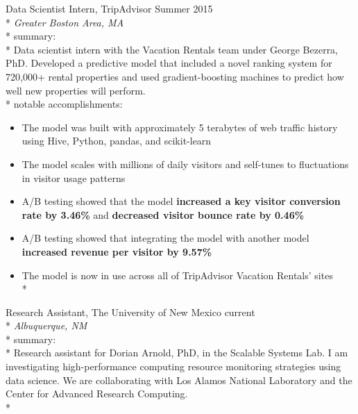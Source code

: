 \documentclass[print]{friggeri-cv} %
\begin{document}
\iftoggle{cv}{
\section{research/work experience}
}{
\section{selected research/work experience}
}
\begin{description} \itemsep1pt \parskip0pt 
  \item {\largeheaderfont Data Scientist Intern, TripAdvisor} \hfill
    {\smallheaderfont Summer 2015}\\*
    {\footnotesize \emph{Greater Boston Area, MA}} \\*
    {\smallheaderfont summary}: \\*
    Data scientist intern with the Vacation Rentals team under George Bezerra, PhD.
    Developed a predictive model that included a novel ranking system for
    720,000+ rental properties and used gradient-boosting machines to predict
    how well new properties will perform. \\*
    {\smallheaderfont notable accomplishments}:
    \begin{itemize} \itemsep1pt \parskip1pt 
      \item The model was built with approximately 5 terabytes of web traffic
            history using Hive, Python, pandas, and scikit-learn
      \item The model scales with millions of daily visitors and self-tunes to
            fluctuations in visitor usage patterns
      \item A/B testing showed that the model \textbf{increased a key visitor conversion
            rate by 3.46\%} and \textbf{decreased visitor bounce rate by 0.46\%}
      \item A/B testing showed that integrating the model with another model
            \textbf{increased revenue per visitor by 9.57\%}
      \item The model is now in use across all of TripAdvisor Vacation Rentals' sites\\*
    \end{itemize}

  \item {\largeheaderfont Research Assistant, The University of New Mexico} \hfill
    {\textemdash current}\\*
    {\footnotesize \emph{Albuquerque, NM }} \\*
    {\smallheaderfont summary}: \\*
    Research assistant for Dorian Arnold, PhD, in the Scalable Systems Lab.  I
    am investigating high-performance computing resource monitoring strategies
    using data science. We are collaborating with Los Alamos National
    Laboratory and the Center for Advanced Research Computing. \\*


\end{description}
\end{document}
